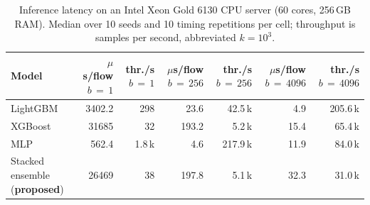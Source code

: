 \begin{table}[!t]
\setlength{\tabcolsep}{4pt}
\centering
\caption{Inference latency on an Intel Xeon Gold 6130 CPU server (60 cores, 256\,GB RAM). Median over 10 seeds and 10 timing repetitions per cell; throughput is samples per second, abbreviated $k = 10^{3}$.}
\label{tab:latency}
\begin{tabular}{lrrrrrr}
\toprule
Model & $\mu$s/flow $b\,{=}\,1$ & thr./s $b\,{=}\,1$ & $\mu$s/flow $b\,{=}\,256$ & thr./s $b\,{=}\,256$ & $\mu$s/flow $b\,{=}\,4096$ & thr./s $b\,{=}\,4096$ \\
\midrule
LightGBM & 3402.2 & 298 & 23.6 & 42.5\,k & 4.9 & 205.6\,k \\
XGBoost & 31685 & 32 & 193.2 & 5.2\,k & 15.4 & 65.4\,k \\
MLP & 562.4 & 1.8\,k & 4.6 & 217.9\,k & 11.9 & 84.0\,k \\
Stacked ensemble (\textbf{proposed}) & 26469 & 38 & 197.8 & 5.1\,k & 32.3 & 31.0\,k \\
\bottomrule
\end{tabular}
\end{table}